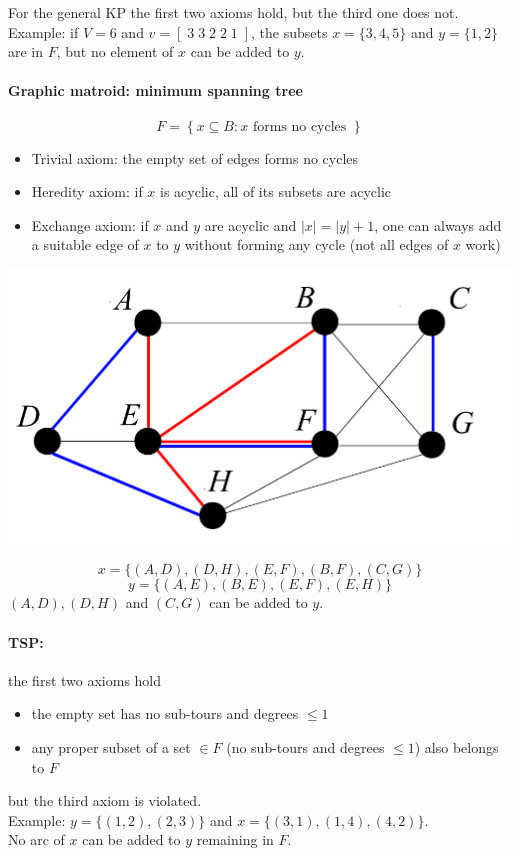 For the general KP the first two axioms hold, but the third one does not.\\
Example: if $V = 6$ and $v = [\; 3 \; 3 \; 2 \; 2 \; 1 \; ]$, the subsets $x = \{3, 4, 5\}$ and $y = \{1, 2\}$ are in $F$, but no element of $x$ can be added to $y$.\\

\newpage

\paragraph{Graphic matroid: minimum spanning tree}
$$ F = \left\{x \subseteq B : x \text{ forms no cycles }\right\}$$

\begin{itemize}
	\item Trivial axiom: the empty set of edges forms no cycles
	\item Heredity axiom: if $x$ is acyclic, all of its subsets are acyclic
	\item Exchange axiom: if $x$ and $y$ are acyclic and $|x| = |y | + 1$, one can always add a suitable edge of $x$ to $y$ without forming any cycle (not all edges of $x$ work)
\end{itemize}
\begin{center}
	\includegraphics[width=0.6\columnwidth]{img/matroid1}
\end{center}
$$ x = \{(A, D) , (D, H) , (E , F ) , (B, F ) , (C , G )\} $$
$$ y = \{(A, E ) , (B, E ) , (E , F ) , (E , H)\} $$
$(A, D), (D, H)$ and $(C , G )$ can be added to $y$.\\

\vfill

\paragraph{TSP:} the first two axioms hold
\begin{itemize}
	\item the empty set has no sub-tours and degrees $\leq 1$
	\item any proper subset of a set $\in F$ (no sub-tours and degrees $\leq 1$) also belongs to $F$
\end{itemize}
but the third axiom is violated.\\
Example: $y = \{(1, 2), (2, 3)\}$ and $x = \{(3, 1), (1, 4), (4, 2)\}$.\\
No arc of $x$ can be added to $y$ remaining in $F$.\\

